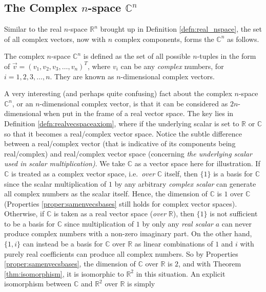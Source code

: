 \subsection{The Complex $n$-space $\mathbb{C}^n$}

Similar to the real $n$-space $\mathbb{R}^n$ brought up in Definition \ref{defn:real_nspace}, the set of all complex vectors, now with $n$ complex components, forms the  $\mathbb{C}^n$ as follows.
\begin{defn}
\label{defn:complex_nspace}
The complex $n$-space $\mathbb{C}^n$ is defined as the set of all possible $n$-tuples in the form of $\vec{v} = (v_1, v_2, v_3, \ldots, v_n)^T$, where $v_i$ can be any \textit{complex} numbers, for $i = 1,2,3,\ldots,n$. They are known as $n$-dimensional complex vectors.
\end{defn}
A very interesting (and perhaps quite confusing) fact about the complex $n$-space $\mathbb{C}^n$, or an $n$-dimensional complex vector, is that it can be considered as $2n$-dimensional when put in the frame of a real vector space. The key lies in Definition \ref{defn:realvecspaceaxiom}, where if the underlying scalar is set to $\mathbb{R}$ or $\mathbb{C}$ so that it becomes a real/complex vector space. Notice the subtle difference between a real/complex vector (that is indicative of its components being real/complex) and real/complex vector space (concerning \textit{the underlying scalar used in scalar multiplication)}. We take $\mathbb{C}$ as a vector space here for illustration. If $\mathbb{C}$ is treated as a complex vector space, i.e.\ \textit{over} $\mathbb{C}$ itself, then $\{1\}$ is a basis for $\mathbb{C}$ since the scalar multiplication of $1$ by any arbitrary \textit{complex scalar} can generate all complex numbers as the scalar itself. Hence, the dimension of $\mathbb{C}$ is $1$ over $\mathbb{C}$ (Properties \ref{proper:samenvecsbases} still holds for complex vector spaces). Otherwise, if $\mathbb{C}$ is taken as a real vector space (\textit{over} $\mathbb{R}$), then $\{1\}$ is not sufficient to be a basis for $\mathbb{C}$ since multiplication of $1$ by only any \textit{real scalar} $a$ can never produce complex numbers with a non-zero imaginary part. On the other hand, $\{1, i\}$ can instead be a basis for $\mathbb{C}$ over $\mathbb{R}$ as linear combinations of $1$ and $i$ with purely real coefficients can produce all complex numbers. So by Properties \ref{proper:samenvecsbases}, the dimension of $\mathbb{C}$ over $\mathbb{R}$ is $2$, and with Theorem \ref{thm:isomorphism}, it is isomorphic to $\mathbb{R}^2$ in this situation. An explicit isomorphism between $\mathbb{C}$ and $\mathbb{R}^2$ over $\mathbb{R}$ is simply
